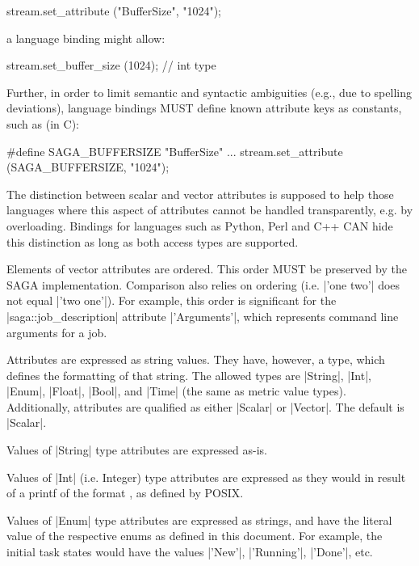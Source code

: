   \up
  \begin{myio}
    stream.set_attribute ("BufferSize", "1024");
  \end{myio}
 
  \up
  a language binding might allow:
 
  \up
  \begin{myio}
    stream.set_buffer_size (1024);  // int type
  \end{myio}
 
  \up
  Further, in order to limit semantic and syntactic ambiguities
  (e.g., due to spelling deviations), language bindings MUST
  define known attribute keys as constants, such as (in C):
 
  \up
  \begin{myio}
    #define SAGA_BUFFERSIZE "BufferSize"
    ...
    stream.set_attribute (SAGA_BUFFERSIZE, "1024");
  \end{myio}
  
  \up
  The distinction between scalar and vector attributes is
  supposed to help those
  languages where this aspect of attributes cannot
  be handled transparently, e.g. by overloading.  Bindings for languages
  such as Python, Perl and C++ CAN hide this distinction as long
  as both access types are supported.
 
  Elements of vector attributes are ordered. This order MUST be 
  preserved by the SAGA implementation.
  Comparison also relies on ordering (i.e. |'one two'| does
  not equal |'two one'|).  For example, this order is
  significant for the |saga::job_description| attribute
  |'Arguments'|, which represents command line arguments for a
  job.
 
  Attributes are expressed as string values. They have,
  however, a type, which defines the formatting of that
  string.  The allowed types are |String|, |Int|, |Enum|,
  |Float|, |Bool|, and |Time| (the same as metric value types).
  Additionally, attributes are qualified as either |Scalar| or
  |Vector|.  The default is |Scalar|.
 
  Values of |String| type attributes are expressed as-is.
 
  Values of |Int| (i.e. Integer) type attributes are expressed
  as they would in result of a printf of the format
  , as defined by POSIX.
 
  Values of |Enum| type attributes are expressed as strings, and
  have the literal value of the respective enums as defined in
  this document.  For example, the initial task states would
  have the values |'New'|, |'Running'|, |'Done'|, etc.
 
